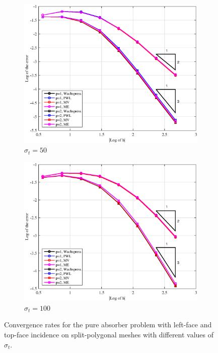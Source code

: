\begin{figure}
{\begin{subfigure}[b]{0.485\textwidth}
	\end{subfigure}
}
\vspace{1cm}
{
	\begin{subfigure}[b]{0.485\textwidth}
		\centering
		\label{subfig::PA_LeftTop_SplitPoly_sig50}
		\includegraphics[width=\textwidth]{figures/sec_BF/PAErr_LeftTop_SplitPoly_sig50.eps}
	\caption{$\sigma_t = 50$}
	\end{subfigure}
	\hfill
	\begin{subfigure}[b]{0.485\textwidth}
		\centering
		\label{subfig::PA_LeftTop_SplitPoly_sig100}
		\includegraphics[width=\textwidth]{figures/sec_BF/PAErr_LeftTop_SplitPoly_sig100.eps}
	\caption{$\sigma_t = 100$}
	\end{subfigure}
}
\caption{Convergence rates for the pure absorber problem with left-face and top-face incidence on split-polygonal meshes with different values of $\sigma_t$.}
\label{fig::BF_Results_PA_LeftTop_SplitPoly}
\end{figure}

